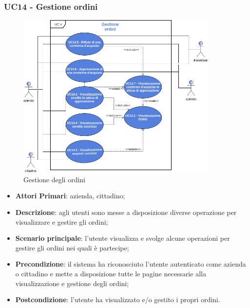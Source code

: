 \subsubsection{UC14 - Gestione ordini}
\begin{figure}[h]
	\includegraphics[width=10cm]{res/images/UC14-GestioneOrdini.png}
	\centering
	\caption{Gestione degli ordini}
\end{figure}
\begin{itemize}
	\item \textbf{Attori Primari}: azienda, cittadino;
	\item \textbf{Descrizione}: agli utenti sono messe a disposizione diverse operazione per visualizzare e gestire gli ordini;
	\item \textbf{Scenario principale}: l'utente visualizza e svolge alcune operazioni per gestire gli ordini nei quali è partecipe;
	\item \textbf{Precondizione}: il sistema ha riconosciuto l'utente autenticato come azienda o cittadino e mette a disposizione tutte le pagine necessarie alla visualizzazione e gestione degli ordini;
	\item \textbf{Postcondizione}: l'utente ha visualizzato e/o gestito i propri ordini.
\end{itemize} 
